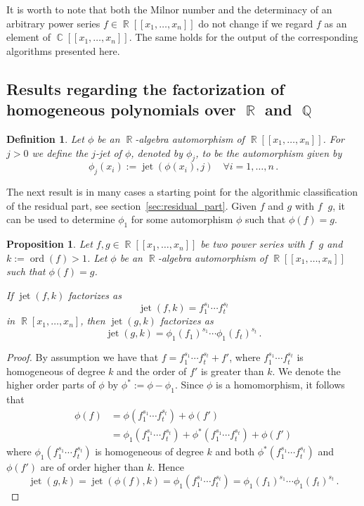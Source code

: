\documentclass[noend]{amsproc}
\newtheorem{defn}[theorem]{Definition}
\newtheorem{prop}[theorem]{Proposition}
\theoremstyle{definition}
\DeclareMathOperator{\ord}{ord}
\DeclareMathOperator{\requiv}{\overset{r}{\sim}}
\DeclareMathOperator{\jet}{jet}
\DeclareMathOperator{\Q}{\mathbb{Q}}
\DeclareMathOperator{\R}{\mathbb{R}}
\DeclareMathOperator{\C}{\mathbb{C}}
\begin{document}
It is worth to note that
both the Milnor number and the determinacy of an arbitrary power series
$f \in \R[[x_1,\ldots,x_n]]$ do not change if we regard $f$ as an element of
$\C[[x_1,\ldots,x_n]]$. The same holds for the output of the corresponding
algorithms presented here.


\subsection{Results regarding the factorization of homogeneous polynomials
over $\R$ and $\Q$}%
\label{ResultsRegardingTheFactorizationOfHomogeneousPolynomialsOverRAndQ}%
\label{subsec:factorization}

\begin{defn}
Let $\phi$ be an $\R$-algebra automorphism of $\R[[x_1,\ldots,x_n]]$.
For $j > 0$ we define the
\emph{$j$-jet} of $\phi$, denoted by $\phi_j$, to be the automorphism given by
\[
\phi_j(x_i) := \jet(\phi(x_i),j) \quad \forall i = 1,\ldots,n \,.
\]
\end{defn}

The next result is in many cases a starting point for the algorithmic
classification of the residual part, see section~\ref{sec:residual_part}. Given
$f$ and $g$ with $f \requiv g$, it can be used to determine $\phi_1$ for some
automorphism $\phi$ such that $\phi(f) = g$.

\begin{prop}\label{kjet}
Let $f,g \in \R[[x_1,\ldots,x_n]]$ be two power series with $f \requiv g$ and
$k := \ord(f) > 1$. Let $\phi$ be an $\R$-algebra automorphism of
$\R[[x_1,\ldots,x_n]]$ such that $\phi(f)=g$.

If $\jet(f,k)$ factorizes as
\[
\jet(f,k) = f_1^{s_1} \cdots f_t^{s_t}
\]
in $\R[x_1,\ldots,x_n]$, then $\jet(g,k)$ factorizes as
\[
\jet(g,k) = \phi_1(f_1)^{s_1} \cdots \phi_1(f_t)^{s_t} \,.
\]
\end{prop}

\begin{proof}
By assumption we have that $f = f_1^{s_1} \cdots f_t^{s_t} + f'$, where
$f_1^{s_1} \cdots f_t^{s_t}$ is homogeneous of degree $k$ and the order of $f'$
is greater than $k$. We denote the higher order parts of $\phi$ by
$\phi^* := \phi-\phi_1$. Since $\phi$ is a homomorphism, it follows that
\begin{align*}
\phi(f) &= \phi(f_1^{s_1} \cdots f_t^{s_t}) + \phi(f') \\
&= \phi_1(f_1^{s_1} \cdots f_t^{s_t})
+ \phi^*(f_1^{s_1} \cdots f_t^{s_t}) + \phi(f')
\end{align*}
where $\phi_1(f_1^{s_1} \cdots f_t^{s_t})$ is homogeneous of degree $k$ and
both $\phi^*(f_1^{s_1} \cdots f_t^{s_t})$ and $\phi(f')$ are of order higher
than $k$. Hence
\[
\jet(g, k) = \jet(\phi(f), k) = \phi_1(f_1^{s_1} \cdots f_t^{s_t})
= \phi_1(f_1)^{s_1} \cdots \phi_1(f_t)^{s_t} \,.
\]
\end{proof}
\end{document}
